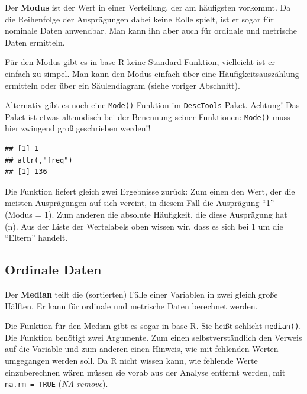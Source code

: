 \documentclass[
]{book}
\newenvironment{Shaded}{\begin{snugshade}}{\end{snugshade}}
\newcommand{\AttributeTok}[1]{\textcolor[rgb]{0.77,0.63,0.00}{#1}}
\newcommand{\ConstantTok}[1]{\textcolor[rgb]{0.00,0.00,0.00}{#1}}
\newcommand{\FunctionTok}[1]{\textcolor[rgb]{0.00,0.00,0.00}{#1}}
\newcommand{\NormalTok}[1]{#1}
\newcommand{\SpecialCharTok}[1]{\textcolor[rgb]{0.00,0.00,0.00}{#1}}
\begin{document}
Der \textbf{Modus} ist der Wert in einer Verteilung, der am häufigsten vorkommt. Da die Reihenfolge der Ausprägungen dabei keine Rolle spielt, ist er sogar für nominale Daten anwendbar. Man kann ihn aber auch für ordinale und metrische Daten ermitteln.

Für den Modus gibt es in base-R keine Standard-Funktion, vielleicht ist er einfach zu simpel. Man kann den Modus einfach über eine Häufigkeitsauszählung ermitteln oder über ein Säulendiagram (siehe voriger Abschnitt).

Alternativ gibt es noch eine \texttt{Mode()}-Funktion im \texttt{DescTools}-Paket. Achtung! Das Paket ist etwas altmodisch bei der Benennung seiner Funktionen: \texttt{Mode()} muss hier zwingend groß geschrieben werden!!

\begin{Shaded}
\end{Shaded}

\begin{verbatim}
## [1] 1
## attr(,"freq")
## [1] 136
\end{verbatim}

Die Funktion liefert gleich zwei Ergebnisse zurück: Zum einen den Wert, der die meisten Ausprägungen auf sich vereint, in diesem Fall die Ausprägung ``1'' (Modus = 1). Zum anderen die absolute Häufigkeit, die diese Ausprägung hat (n). Aus der Liste der Wertelabels oben wissen wir, dass es sich bei 1 um die ``Eltern'' handelt.

\hypertarget{ordinale-daten}{%
\subsection{Ordinale Daten}\label{ordinale-daten}}

Der \textbf{Median} teilt die (sortierten) Fälle einer Variablen in zwei gleich große Hälften. Er kann für ordinale und metrische Daten berechnet werden.

Die Funktion für den Median gibt es sogar in base-R. Sie heißt schlicht \texttt{median()}. Die Funktion benötigt zwei Argumente. Zum einen selbstverständlich den Verweis auf die Variable und zum anderen einen Hinweis, wie mit fehlenden Werten umgegangen werden soll. Da R nicht wissen kann, wie fehlende Werte einzuberechnen wären müssen sie vorab aus der Analyse entfernt werden, mit \texttt{na.rm\ =\ TRUE} (\emph{NA remove}).
\end{document}

